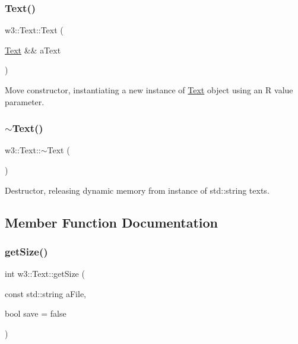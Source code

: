 \subsubsection{\texorpdfstring{Text()}{Text()}\hspace{0.1cm}{\footnotesize\ttfamily [4/4]}}
{\footnotesize\ttfamily w3\+::\+Text\+::\+Text (\begin{DoxyParamCaption}\item[{\mbox{\hyperlink{classw3_1_1Text}{Text}} \&\&}]{a\+Text }\end{DoxyParamCaption})}

Move constructor, instantiating a new instance of \mbox{\hyperlink{classw3_1_1Text}{Text}} object using an R value parameter. \mbox{\label{classw3_1_1Text_a599c6614ba05c4cbd3ef9b8968a73ad4}} 
\subsubsection{\texorpdfstring{$\sim$\+Text()}{~Text()}}
{\footnotesize\ttfamily w3\+::\+Text\+::$\sim$\+Text (\begin{DoxyParamCaption}{ }\end{DoxyParamCaption})}

Destructor, releasing dynamic memory from instance of std\+::string texts. 

\subsection{Member Function Documentation}
\mbox{\label{classw3_1_1Text_a2545c8cbf902b0addb4ba509872ce6a9}} 
\subsubsection{\texorpdfstring{get\+Size()}{getSize()}}
{\footnotesize\ttfamily int w3\+::\+Text\+::get\+Size (\begin{DoxyParamCaption}\item[{const std\+::string}]{a\+File,  }\item[{bool}]{save = {\ttfamily false} }\end{DoxyParamCaption})}

